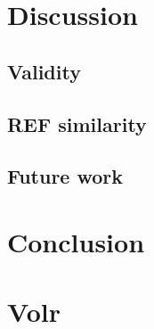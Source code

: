 \documentclass[a4paper,oneside]{memoir}
\begin{document}
\chapter{Discussion}
  \section{Validity}
  \section{REF similarity}
  \section{Future work}

\chapter{Conclusion}

\printbibliography

\appendix
\chapter{Volr} \label{appendix:volr}
  
\end{document}
